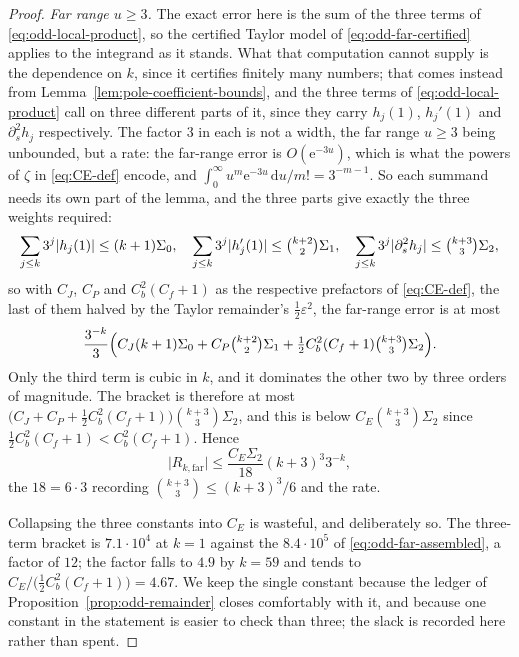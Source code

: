\documentclass[11pt]{amsart}
\theoremstyle{plain}
\theoremstyle{definition}
\newcommand{\e}{\mathrm e}
\newcommand{\dd}{\,\mathrm d}
\newcommand{\abs}[1]{\lvert #1\rvert}
\begin{document}
\begin{proof}
\emph{Far range $u\geq3$.} The exact error here is the sum of the three terms
of \eqref{eq:odd-local-product}, so the certified Taylor model of
\eqref{eq:odd-far-certified} applies to the integrand as it stands. What that
computation cannot supply is the dependence on $k$, since it certifies
finitely many numbers; that comes instead from
Lemma~\ref{lem:pole-coefficient-bounds}, and the three terms of
\eqref{eq:odd-local-product} call on three different parts of it, since they
carry $h_j(1)$, $h_j'(1)$ and $\partial_s^2h_j$ respectively. The factor $3$
in each is not a width, the far range $u\geq3$ being unbounded, but a rate:
the far-range error is $O(\e^{-3u})$, which is what the powers of $\zeta$ in
\eqref{eq:CE-def} encode, and $\int_0^\infty u^m\e^{-3u}\dd u/m!=3^{-m-1}$.
So each summand needs its own part of the lemma, and the three parts give
exactly the three weights required:
\[
 \sum_{j\leq k}3^j\abs{h_j(1)}\leq(k+1)\Sigma_0,
 \quad
 \sum_{j\leq k}3^j\abs{h_j'(1)}\leq\tbinom{k+2}{2}\Sigma_1,
 \quad
 \sum_{j\leq k}3^j\abs{\partial_s^2h_j}\leq\tbinom{k+3}{3}\Sigma_2,
\]
so with $C_J$, $C_P$ and $C_b^2(C_f+1)$ as the respective prefactors of
\eqref{eq:CE-def}, the last of them halved by the Taylor remainder's
$\tfrac12\varepsilon^2$, the far-range error is at most
\[
 \frac{3^{-k}}{3}\Bigl(
   C_J(k+1)\Sigma_0
   +C_P\tbinom{k+2}{2}\Sigma_1
   +\tfrac12C_b^2(C_f+1)\tbinom{k+3}{3}\Sigma_2
 \Bigr).
\]
Only the third term is cubic in $k$, and it dominates the other two by three
orders of magnitude. The bracket is therefore at most
$\bigl(C_J+C_P+\tfrac12C_b^2(C_f+1)\bigr)\binom{k+3}{3}\Sigma_2$, and this is
below $C_E\binom{k+3}{3}\Sigma_2$ since
$\tfrac12C_b^2(C_f+1)<C_b^2(C_f+1)$. Hence
\begin{equation}\label{eq:odd-far-assembled}
 \abs{R_{k,\mathrm{far}}}\leq\frac{C_E\Sigma_2}{18}(k+3)^3 3^{-k},
\end{equation}
the $18=6\cdot3$ recording $\binom{k+3}{3}\leq(k+3)^3/6$ and the rate.

Collapsing the three constants into $C_E$ is wasteful, and deliberately so.
The three-term bracket is $7.1\cdot10^{4}$ at $k=1$ against the
$8.4\cdot10^{5}$ of \eqref{eq:odd-far-assembled}, a factor of $12$; the factor
falls to $4.9$ by $k=59$ and tends to
$C_E/\bigl(\tfrac12C_b^2(C_f+1)\bigr)=4.67$. We keep the single constant
because the ledger of Proposition~\ref{prop:odd-remainder} closes comfortably
with it, and because one constant in the statement is easier to check than
three; the slack is recorded here rather than spent.


\end{proof}
\end{document}
